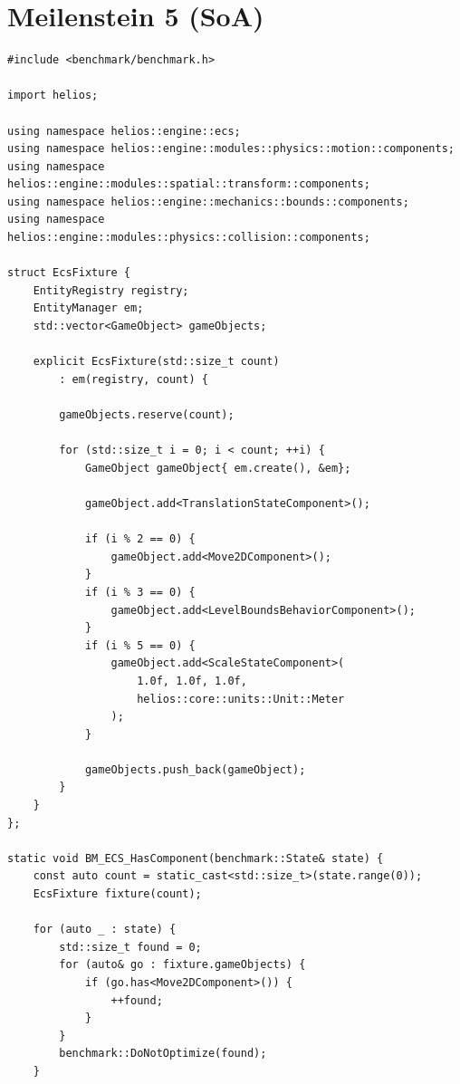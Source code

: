 \section{Meilenstein 5 (SoA)}\label{sec:benchmarkcode_soa}

\begin{lstlisting}[style=c++style,
basicstyle=\ttfamily\footnotesize,
    caption={Benchmark-Quellcode basierend auf der SoA-Implementierung der ECS-Infrastruktur in Meilenstein~5.},
    label=lst:soa_benchmark]
#include <benchmark/benchmark.h>

import helios;

using namespace helios::engine::ecs;
using namespace helios::engine::modules::physics::motion::components;
using namespace helios::engine::modules::spatial::transform::components;
using namespace helios::engine::mechanics::bounds::components;
using namespace helios::engine::modules::physics::collision::components;

struct EcsFixture {
    EntityRegistry registry;
    EntityManager em;
    std::vector<GameObject> gameObjects;

    explicit EcsFixture(std::size_t count)
        : em(registry, count) {

        gameObjects.reserve(count);

        for (std::size_t i = 0; i < count; ++i) {
            GameObject gameObject{ em.create(), &em};

            gameObject.add<TranslationStateComponent>();

            if (i % 2 == 0) {
                gameObject.add<Move2DComponent>();
            }
            if (i % 3 == 0) {
                gameObject.add<LevelBoundsBehaviorComponent>();
            }
            if (i % 5 == 0) {
                gameObject.add<ScaleStateComponent>(
                    1.0f, 1.0f, 1.0f,
                    helios::core::units::Unit::Meter
                );
            }

            gameObjects.push_back(gameObject);
        }
    }
};

static void BM_ECS_HasComponent(benchmark::State& state) {
    const auto count = static_cast<std::size_t>(state.range(0));
    EcsFixture fixture(count);

    for (auto _ : state) {
        std::size_t found = 0;
        for (auto& go : fixture.gameObjects) {
            if (go.has<Move2DComponent>()) {
                ++found;
            }
        }
        benchmark::DoNotOptimize(found);
    }


\end{lstlisting}
